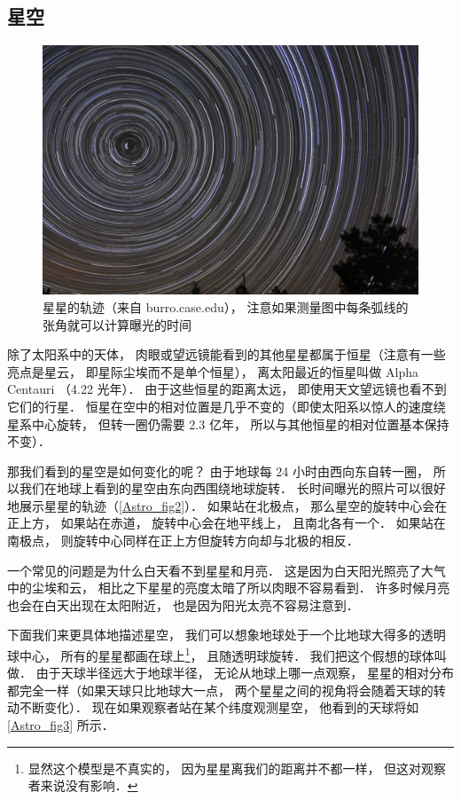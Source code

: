 \subsection{星空}

\begin{figure}[ht]
\centering
\includegraphics[width=14cm]{./figures/Astro2.pdf}
\caption{星星的轨迹（来自 burro.case.edu）， 注意如果测量图中每条弧线的张角就可以计算曝光的时间} \label{Astro_fig2}
\end{figure}

除了太阳系中的天体， 肉眼或望远镜能看到的其他星星都属于恒星（注意有一些亮点是星云， 即星际尘埃而不是单个恒星）， 离太阳最近的恒星叫做 Alpha Centauri （4.22 光年）． 由于这些恒星的距离太远， 即使用天文望远镜也看不到它们的行星． 恒星在空中的相对位置是几乎不变的（即使太阳系以惊人的速度绕星系中心旋转， 但转一圈仍需要 2.3 亿年， 所以与其他恒星的相对位置基本保持不变）．

那我们看到的星空是如何变化的呢？ 由于地球每 24 小时由西向东自转一圈， 所以我们在地球上看到的星空由东向西围绕地球旋转． 长时间曝光的照片可以很好地展示星星的轨迹（\autoref{Astro_fig2}）． 如果站在北极点， 那么星空的旋转中心会在正上方， 如果站在赤道， 旋转中心会在地平线上， 且南北各有一个． 如果站在南极点， 则旋转中心同样在正上方但旋转方向却与北极的相反．

一个常见的问题是为什么白天看不到星星和月亮． 这是因为白天阳光照亮了大气中的尘埃和云， 相比之下星星的亮度太暗了所以肉眼不容易看到． 许多时候月亮也会在白天出现在太阳附近， 也是因为阳光太亮不容易注意到．

下面我们来更具体地描述星空， 我们可以想象地球处于一个比地球大得多的透明球中心， 所有的星星都画在球上\footnote{显然这个模型是不真实的， 因为星星离我们的距离并不都一样， 但这对观察者来说没有影响．}， 且随透明球旋转． 我们把这个假想的球体叫做． 由于天球半径远大于地球半径， 无论从地球上哪一点观察， 星星的相对分布都完全一样（如果天球只比地球大一点， 两个星星之间的视角将会随着天球的转动不断变化）． 现在如果观察者站在某个纬度观测星空， 他看到的天球将如\autoref{Astro_fig3} 所示．

